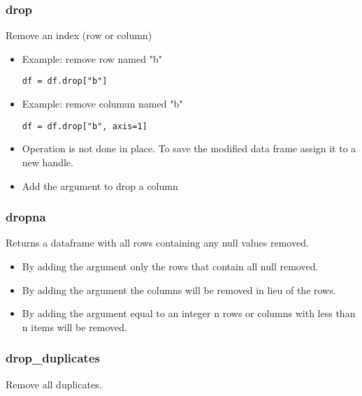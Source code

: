 \subsubsection{drop}
Remove an index (row or column)
  \begin{itemize}

    \item Example: remove row named "b"
\begin{lstlisting}
df = df.drop["b"]
\end{lstlisting}

    \item Example: remove columun named "b"
\begin{lstlisting}
df = df.drop["b", axis=1]
\end{lstlisting}

    \item Operation is not done in place.  To save the modified data frame
      assign it to a new handle.

    \item Add the argument \color{red}{axis=1} to drop a column
  \end{itemize}

%
\subsubsection{dropna}
Returns a dataframe with all rows containing any null values removed.
  \begin{itemize}

    \item By adding the argument {\color{red}{how='all'}} only the rows that
      contain all null removed.

    \item By adding the argument {\color{red}{axis=1}} the columns will be
      removed in lieu of the rows.

    \item By adding the argument {\color{red}{thresh}} equal to an integer n
      rows or columns with less than n items will be removed.
  \end{itemize}

%
\subsubsection{drop\_duplicates}
Remove all duplicates.

